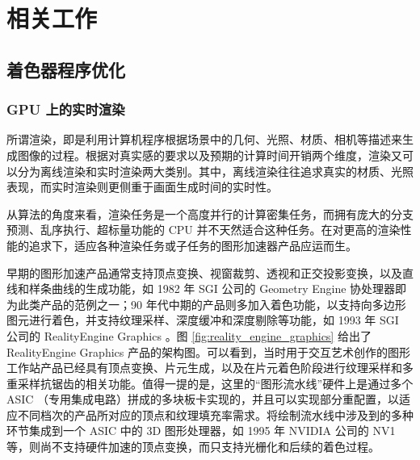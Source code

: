 
\chapter{相关工作}

\section{着色器程序优化}

\subsection{GPU 上的实时渲染}

\label{sec:realtime_rendering_in_gpu}

所谓渲染，即是利用计算机程序根据场景中的几何、光照、材质、相机等描述来生成图像的过程。根据对真实感的要求以及预期的计算时间开销两个维度，渲染又可以分为离线渲染和实时渲染两大类别。其中，离线渲染往往追求真实的材质、光照表现，而实时渲染则更侧重于画面生成时间的实时性。


从算法的角度来看，渲染任务是一个高度并行的计算密集任务，而拥有庞大的分支预测、乱序执行、超标量功能的 CPU 并不天然适合这种任务。在对更高的渲染性能的追求下，适应各种渲染任务或子任务的图形加速器产品应运而生。

早期的图形加速产品通常支持顶点变换、视窗裁剪、透视和正交投影变换，以及直线和样条曲线的生成功能，如 1982 年 SGI 公司的 Geometry Engine \cite{GeometryEngineSGI} 协处理器即为此类产品的范例之一；90 年代中期的产品则多加入着色功能，以支持向多边形图元进行着色，并支持纹理采样、深度缓冲和深度剔除等功能，如 1993 年 SGI 公司的 RealityEngine Graphics \cite{RealityEngineSGI}。图 \ref{fig:reality_engine_graphics} 给出了 RealityEngine Graphics 产品的架构图。可以看到，当时用于交互艺术创作的图形工作站产品已经具有顶点变换、片元生成，以及在片元着色阶段进行纹理采样和多重采样抗锯齿的相关功能。值得一提的是，这里的“图形流水线”硬件上是通过多个 ASIC （专用集成电路）拼成的多块板卡实现的，并且可以实现部分重配置，以适应不同档次的产品所对应的顶点和纹理填充率需求。将绘制流水线中涉及到的多种环节集成到一个 ASIC 中的 3D 图形处理器，如 1995 年 NVIDIA 公司的 NV1 \cite{NV1NVIDIA, NV1NVIDIANews} 等，则尚不支持硬件加速的顶点变换，而只支持光栅化和后续的着色过程。

